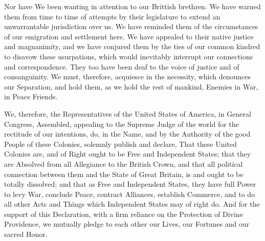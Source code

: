 \documentclass{article}
\begin{document}
Nor have We been wanting in attention to our Brittish brethren.
We have warned them from time to time of attempts by their
legislature to extend an unwarrantable jurisdiction over us.
We have reminded them of the circumstances of our emigration and
settlement here.  We have appealed to their native justice
and magnanimity, and we have conjured them by the ties of our
common kindred to disavow these usurpations, which would inevitably
interrupt our connections and correspondence.  They too have been
deaf to the voice of justice and of consanguinity.  We must, therefore,
acquiesce in the necessity, which denounces our Separation, and hold them,
as we hold the rest of mankind, Enemies in War, in Peace Friends.

We, therefore, the Representatives of the United States of America,
in General Congress, Assembled, appealing to the Supreme Judge of
the world for the rectitude of our intentions, do, in the Name,
and by the Authority of the good People of these Colonies,
solemnly publish and declare, That these United Colonies are,
and of Right ought to be Free and Independent States;
that they are Absolved from all Allegiance to the British Crown,
and that all political connection between them and the State
of Great Britain, is and ought to be totally dissolved;
and that as Free and Independent States, they have full Power to
levy War, conclude Peace, contract Alliances, establish Commerce,
and to do all other Acts and Things which Independent States may
of right do.  And for the support of this Declaration, with a firm
reliance on the Protection of Divine Providence, we mutually pledge
to each other our Lives, our Fortunes and our sacred Honor.
\end{document}
